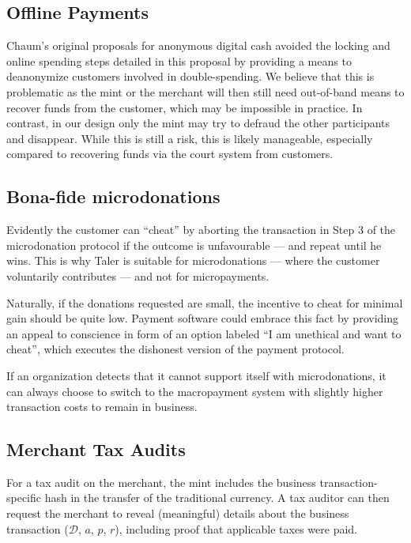 \documentclass{llncs}
\begin{document}
\subsection{Offline Payments}

Chaum's original proposals for anonymous digital cash avoided the
locking and online spending steps detailed in this proposal by
providing a means to deanonymize customers involved in
double-spending.  We believe that this is problematic as the mint or
the merchant will then still need out-of-band means to recover funds
from the customer, which may be impossible in practice.  In contrast,
in our design only the mint may try to defraud the other participants
and disappear.  While this is still a risk, this is likely manageable,
especially compared to recovering funds via the court system from
customers.


\subsection{Bona-fide microdonations}

Evidently the customer can ``cheat'' by aborting the transaction in
Step 3 of the microdonation protocol if the outcome is unfavourable ---
and repeat until he wins.  This is why Taler is suitable for
microdonations --- where the customer voluntarily contributes ---
and not for micropayments.

Naturally, if the donations requested are small, the incentive to
cheat for minimal gain should be quite low.  Payment software could
embrace this fact by providing an appeal to conscience in form of an
option labeled ``I am unethical and want to cheat'', which executes
the dishonest version of the payment protocol.

If an organization detects that it cannot support itself with
microdonations, it can always choose to switch to the macropayment
system with slightly higher transaction costs to remain in business.

\subsection{Merchant Tax Audits}

For a tax audit on the merchant, the mint includes the business
transaction-specific hash in the transfer of the traditional
currency.  A tax auditor can then request the merchant to reveal
(meaningful) details about the business transaction ($\mathcal{D}$,
$a$, $p$, $r$), including proof that applicable taxes were paid.
\end{document}
